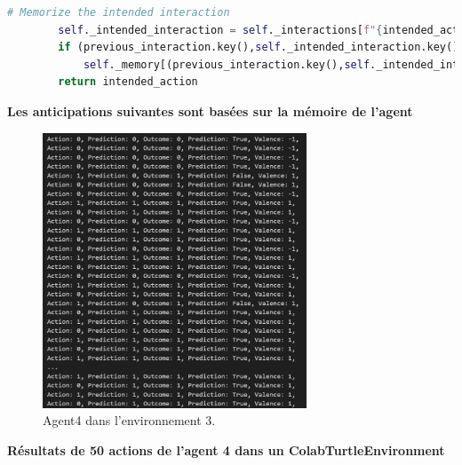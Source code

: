 \documentclass[a4paper, 12pt]{article}
\begin{document}
\begin{lstlisting}[language=Python, caption={Implementation de l'Agent4}]
        # Memorize the intended interaction
        self._intended_interaction = self._interactions[f"{intended_action}{intended_outcome}"]
        if (previous_interaction.key(),self._intended_interaction.key()) not in self._memory:
            self._memory[(previous_interaction.key(),self._intended_interaction.key())] = None
        return intended_action
\end{lstlisting}

\newpage

\noindent \large \textbf{Les anticipations suivantes sont basées sur la mémoire de l'agent}
\normalsize

\begin{figure}[h]
    \centering
    \includegraphics[width=0.7\textwidth]{ReportImages/Agent4/Agent4_Env3.png}
    \caption{Agent4 dans l'environnement 3.}
\end{figure}

\newpage

\noindent \large \textbf{Résultats de 50 actions de l'agent 4 dans un ColabTurtleEnvironment}
\normalsize
\end{document}
